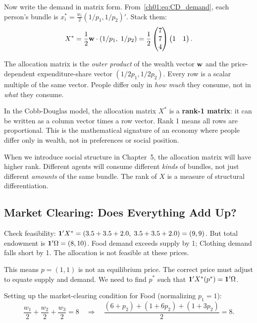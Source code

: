 \documentclass[../structural_economics_book.tex]{subfiles}
\begin{document}
Now write the demand in matrix form. From~\eqref{ch01:eq:CD_demand}, each person's bundle is $x_i^* = \frac{w_i}{2}(1/p_1, 1/p_2)'$. Stack them:
\begin{equation}\label{ch01:eq:CD_matrix}
X^* = \frac{1}{2} \mathbf{w} \cdot (1/p_1, \; 1/p_2) = \frac{1}{2} \begin{pmatrix} 7 \\ 7 \\ 4 \end{pmatrix} \begin{pmatrix} 1 & 1 \end{pmatrix}.
\end{equation}

The allocation matrix is the \textit{outer product} of the wealth vector $\mathbf{w}$ and the price-dependent expenditure-share vector $(1/2p_1, 1/2p_2)$. Every row is a scalar multiple of the same vector. People differ only in \textit{how much} they consume, not in \textit{what} they consume.

\begin{keyinsight}
In the Cobb-Douglas model, the allocation matrix $X^*$ is a \textbf{rank-1 matrix}: it can be written as a column vector times a row vector. Rank 1 means all rows are proportional. This is the mathematical signature of an economy where people differ only in wealth, not in preferences or social position.

When we introduce social structure in Chapter~5, the allocation matrix will have higher rank. Different agents will consume different \textit{kinds} of bundles, not just different \textit{amounts} of the same bundle. The rank of $X$ is a measure of structural differentiation.
\end{keyinsight}


\subsection{Market Clearing: Does Everything Add Up?}

Check feasibility: $\mathbf{1}'X^* = (3.5 + 3.5 + 2.0, \; 3.5 + 3.5 + 2.0) = (9, 9)$. But total endowment is $\mathbf{1}'\Omega = (8, 10)$. Food demand exceeds supply by 1; Clothing demand falls short by 1. The allocation is not feasible at these prices.

This means $p = (1, 1)$ is not an equilibrium price. The correct price must adjust to equate supply and demand. We need to find $p^*$ such that $\mathbf{1}'X^*(p^*) = \mathbf{1}'\Omega$.

Setting up the market-clearing condition for Food (normalizing $p_1 = 1$):
\begin{equation}
\frac{w_1}{2} + \frac{w_2}{2} + \frac{w_3}{2} = 8 \quad \Rightarrow \quad \frac{(6 + p_2) + (1 + 6p_2) + (1 + 3p_2)}{2} = 8.
\end{equation}
\end{document}
